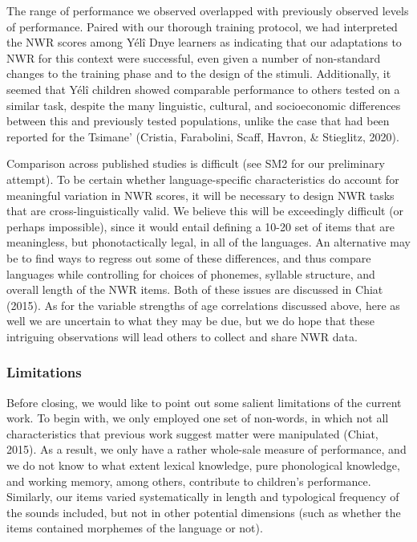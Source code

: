 \documentclass[
  american,
  ,man,floatsintext]{apa6}
\begin{document}
The range of performance we observed overlapped with previously observed levels of performance. Paired with our thorough training protocol, we had interpreted the NWR scores among Yélî Dnye learners as indicating that our adaptations to NWR for this context were successful, even given a number of non-standard changes to the training phase and to the design of the stimuli. Additionally, it seemed that Yélî children showed comparable performance to others tested on a similar task, despite the many linguistic, cultural, and socioeconomic differences between this and previously tested populations, unlike the case that had been reported for the Tsimane' (Cristia, Farabolini, Scaff, Havron, \& Stieglitz, 2020).

Comparison across published studies is difficult (see SM2 for our preliminary attempt). To be certain whether language-specific characteristics do account for meaningful variation in NWR scores, it will be necessary to design NWR tasks that are cross-linguistically valid. We believe this will be exceedingly difficult (or perhaps impossible), since it would entail defining a 10-20 set of items that are meaningless, but phonotactically legal, in all of the languages. An alternative may be to find ways to regress out some of these differences, and thus compare languages while controlling for choices of phonemes, syllable structure, and overall length of the NWR items. Both of these issues are discussed in Chiat (2015). As for the variable strengths of age correlations discussed above, here as well we are uncertain to what they may be due, but we do hope that these intriguing observations will lead others to collect and share NWR data.

\hypertarget{limitations}{%
\subsubsection{Limitations}\label{limitations}}

Before closing, we would like to point out some salient limitations of the current work. To begin with, we only employed one set of non-words, in which not all characteristics that previous work suggest matter were manipulated (Chiat, 2015). As a result, we only have a rather whole-sale measure of performance, and we do not know to what extent lexical knowledge, pure phonological knowledge, and working memory, among others, contribute to children's performance. Similarly, our items varied systematically in length and typological frequency of the sounds included, but not in other potential dimensions (such as whether the items contained morphemes of the language or not).
\end{document}
